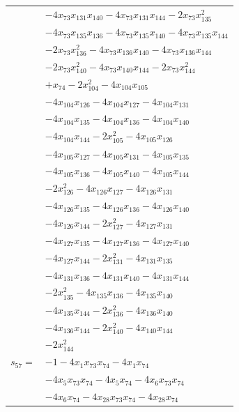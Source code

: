\begin{longtable}{@{}r@{\;}l@{}}
 & \(\displaystyle -4x_{73}x_{131}x_{140} -4x_{73}x_{131}x_{144} -2x_{73}x_{135}^{2}\) \\
 & \(\displaystyle -4x_{73}x_{135}x_{136} -4x_{73}x_{135}x_{140} -4x_{73}x_{135}x_{144}\) \\
 & \(\displaystyle -2x_{73}x_{136}^{2} -4x_{73}x_{136}x_{140} -4x_{73}x_{136}x_{144}\) \\
 & \(\displaystyle -2x_{73}x_{140}^{2} -4x_{73}x_{140}x_{144} -2x_{73}x_{144}^{2}\) \\
 & \(\displaystyle +x_{74} -2x_{104}^{2} -4x_{104}x_{105}\) \\
 & \(\displaystyle -4x_{104}x_{126} -4x_{104}x_{127} -4x_{104}x_{131}\) \\
 & \(\displaystyle -4x_{104}x_{135} -4x_{104}x_{136} -4x_{104}x_{140}\) \\
 & \(\displaystyle -4x_{104}x_{144} -2x_{105}^{2} -4x_{105}x_{126}\) \\
 & \(\displaystyle -4x_{105}x_{127} -4x_{105}x_{131} -4x_{105}x_{135}\) \\
 & \(\displaystyle -4x_{105}x_{136} -4x_{105}x_{140} -4x_{105}x_{144}\) \\
 & \(\displaystyle -2x_{126}^{2} -4x_{126}x_{127} -4x_{126}x_{131}\) \\
 & \(\displaystyle -4x_{126}x_{135} -4x_{126}x_{136} -4x_{126}x_{140}\) \\
 & \(\displaystyle -4x_{126}x_{144} -2x_{127}^{2} -4x_{127}x_{131}\) \\
 & \(\displaystyle -4x_{127}x_{135} -4x_{127}x_{136} -4x_{127}x_{140}\) \\
 & \(\displaystyle -4x_{127}x_{144} -2x_{131}^{2} -4x_{131}x_{135}\) \\
 & \(\displaystyle -4x_{131}x_{136} -4x_{131}x_{140} -4x_{131}x_{144}\) \\
 & \(\displaystyle -2x_{135}^{2} -4x_{135}x_{136} -4x_{135}x_{140}\) \\
 & \(\displaystyle -4x_{135}x_{144} -2x_{136}^{2} -4x_{136}x_{140}\) \\
 & \(\displaystyle -4x_{136}x_{144} -2x_{140}^{2} -4x_{140}x_{144}\) \\
 & \(\displaystyle -2x_{144}^{2}\) \\[3pt]
\(s_{57}=\) & \(\displaystyle -1 -4x_{1}x_{73}x_{74} -4x_{1}x_{74}\) \\
 & \(\displaystyle -4x_{5}x_{73}x_{74} -4x_{5}x_{74} -4x_{6}x_{73}x_{74}\) \\
 & \(\displaystyle -4x_{6}x_{74} -4x_{28}x_{73}x_{74} -4x_{28}x_{74}\) \\

\end{longtable}
